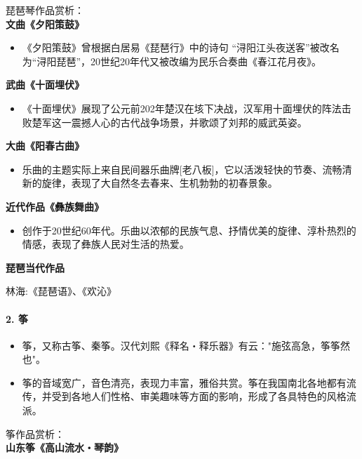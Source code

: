 \documentclass[
]{article}
\providecommand{\tightlist}{%
  \setlength{\itemsep}{0pt}\setlength{\parskip}{0pt}}
\begin{document}
琵琶琴作品赏析：\\
\textbf{文曲《夕阳策鼓》}

\begin{itemize}
\tightlist
\item
  《夕阳策鼓》曾根据白居易《琵琶行》中的诗句
  ``浔阳江头夜送客''被改名为``浔阳琵琶''，20世纪20年代又被改编为民乐合奏曲《春江花月夜》。
\end{itemize}

\textbf{武曲《十面埋伏》}

\begin{itemize}
\tightlist
\item
  《十面埋伏》展现了公元前202年楚汉在垓下决战，汉军用十面埋伏的阵法击败楚军这一震撼人心的古代战争场景，并歌颂了刘邦的威武英姿。
\end{itemize}

\textbf{大曲《阳春古曲》}

\begin{itemize}
\tightlist
\item
  乐曲的主题实际上来自民间器乐曲牌{[}老八板{]}，它以活泼轻快的节奏、流畅清新的旋律，表现了大自然冬去春来、生机勃勃的初春景象。
\end{itemize}

\textbf{近代作品《彝族舞曲》}

\begin{itemize}
\tightlist
\item
  创作于20世纪60年代。乐曲以浓郁的民族气息、抒情优美的旋律、淳朴热烈的情感，表现了彝族人民对生活的热爱。
\end{itemize}

\textbf{琵琶当代作品}

林海:《琵琶语》、《欢沁》

\paragraph{2. 筝}\label{ux7b5d}

\begin{itemize}
\tightlist
\item
  筝，又称古筝、秦筝。汉代刘熙《释名・释乐器》有云："施弦高急，筝筝然也"。
\item
  筝的音域宽广，音色清亮，表现力丰富，雅俗共赏。筝在我国南北各地都有流传，并受到各地人们性格、审美趣味等方面的影响，形成了各具特色的风格流派。
\end{itemize}

筝作品赏析：\\
\textbf{山东筝《高山流水・琴韵》}
\end{document}
